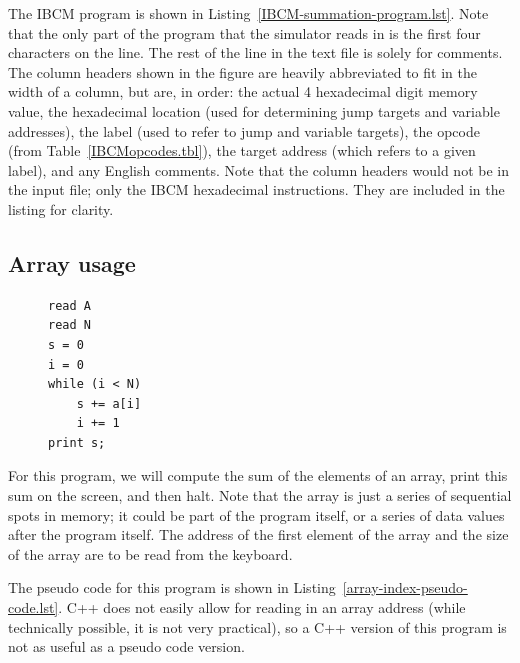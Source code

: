 The IBCM program is shown in Listing~\ref{IBCM-summation-program.lst}.
Note that the only part of the program that the simulator reads in is
the first four characters on the line.  The rest of the line in the
text file is solely for comments.  The column headers shown in the
figure are heavily abbreviated to fit in the width of a column, but
are, in order: the actual 4 hexadecimal digit memory value, the
hexadecimal location (used for determining jump targets and variable
addresses), the label (used to refer to jump and variable targets),
the opcode (from Table~\ref{IBCMopcodes.tbl}), the target address (which
refers to a given label), and any English comments. Note that the
column headers would not be in the input file; only the IBCM
hexadecimal instructions.  They are included in the listing for
clarity.

\begin{figure}[h]

\end{figure}

\subsection{Array usage}

\begin{figure}
\begin{lstlisting}[caption=Array index pseudo code,label={array-index-pseudo-code.lst},backgroundcolor=\color{white},frame=trBL,linewidth=3.2in,xleftmargin=0.25in]
read A
read N
s = 0
i = 0
while (i < N)
	s += a[i]
	i += 1
print s;
\end{lstlisting}
\vspace{-0.4in}
\end{figure}

For this program, we will compute the sum of the elements of an array,
print this sum on the screen, and then halt.  Note that the array is
just a series of sequential spots in memory; it could be part of the
program itself, or a series of data values after the program itself.
The address of the first element of the array and the size of the
array are to be read from the keyboard.

The pseudo code for this program is shown in
Listing~\ref{array-index-pseudo-code.lst}.  C++ does not easily allow
for reading in an array address (while technically possible, it is not
very practical), so a C++ version of this program is not as useful as
a pseudo code version.

